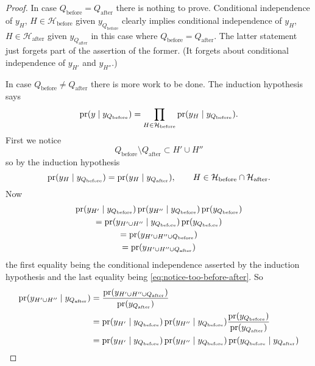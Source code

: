 \begin{proof}
In case $Q_\text{before} = Q_\text{after}$ there is nothing to prove.
Conditional independence of $y_H$, $H \in \mathcal{H}_\text{before}$
given $y_{Q_\text{before}}$ clearly implies conditional independence
of $y_H$, $H \in \mathcal{H}_\text{after}$
given $y_{Q_\text{after}}$ in this case
where $Q_\text{before} = Q_\text{after}$.
The latter statement just forgets part of the assertion of the former.
(It forgets about conditional independence of $y_{H'}$ and $y_{H''}$.)

In case $Q_\text{before} \neq Q_\text{after}$ there is more work to be done.
The induction hypothesis says
$$
   \operatorname{pr}(y \mid y_{Q_\text{before}})
   =
   \prod_{H \in \mathcal{H}_\text{before}}
   \operatorname{pr}(y_H \mid y_{Q_\text{before}}).
$$
First we notice
\begin{equation} \label{eq:notice-too-before-after}
   Q_\text{before} \setminus Q_\text{after} \subset H' \cup H''
\end{equation}
so by the induction hypothesis
\begin{equation} \label{eq:notice-before-after}
   \operatorname{pr}(y_H \mid y_{Q_\text{before}})
   =
   \operatorname{pr}(y_H \mid y_{Q_\text{after}}),
   \qquad
   H \in \mathcal{H}_\text{before} \cap \mathcal{H}_\text{after}.
\end{equation}
Now
\begin{multline*}
   \operatorname{pr}(y_{H'} \mid y_{Q_\text{before}})
   \operatorname{pr}(y_{H''} \mid y_{Q_\text{before}})
   \operatorname{pr}(y_{Q_\text{before}})
   \\
   =
   \operatorname{pr}(y_{H' \cup H''} \mid y_{Q_\text{before}})
   \operatorname{pr}(y_{Q_\text{before}})
   \\
   =
   \operatorname{pr}(y_{H' \cup H'' \cup Q_\text{before}})
   \\
   =
   \operatorname{pr}(y_{H' \cup H'' \cup Q_\text{after}})
\end{multline*}
the first equality being the conditional independence asserted
by the induction hypothesis and the last equality being
\eqref{eq:notice-too-before-after}.  So
\begin{align*}
   \operatorname{pr}(y_{H' \cup H''} \mid  y_{Q_\text{after}})
   & =
   \frac{\operatorname{pr}(y_{H' \cup H'' \cup Q_\text{after}})}{\operatorname{pr}(y_{Q_\text{after}})}
   \\
   & =
   \operatorname{pr}(y_{H'} \mid y_{Q_\text{before}})
   \operatorname{pr}(y_{H''} \mid y_{Q_\text{before}})
   \frac{\operatorname{pr}(y_{Q_\text{before}})}{\operatorname{pr}(y_{Q_\text{after}})}
   \\
   & =
   \operatorname{pr}(y_{H'} \mid y_{Q_\text{before}})
   \operatorname{pr}(y_{H''} \mid y_{Q_\text{before}})
   \operatorname{pr}(y_{Q_\text{before}} \mid y_{Q_\text{after}})
\end{align*}

\end{proof}
